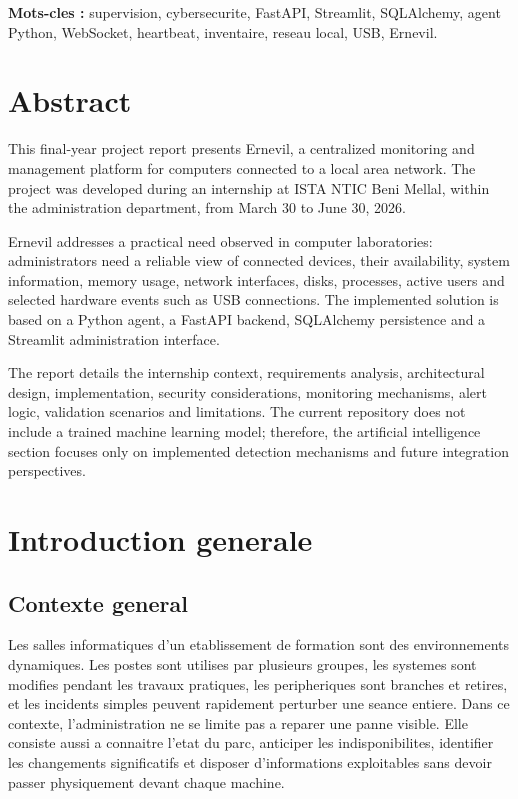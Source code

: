 \documentclass[12pt,a4paper]{report}
\begin{document}
\textbf{Mots-cles :} supervision, cybersecurite, FastAPI, Streamlit, SQLAlchemy, agent Python, WebSocket, heartbeat, inventaire, reseau local, USB, Ernevil.

\chapter*{Abstract}
This final-year project report presents Ernevil, a centralized monitoring and management platform for computers connected to a local area network. The project was developed during an internship at ISTA NTIC Beni Mellal, within the administration department, from March 30 to June 30, 2026.

Ernevil addresses a practical need observed in computer laboratories: administrators need a reliable view of connected devices, their availability, system information, memory usage, network interfaces, disks, processes, active users and selected hardware events such as USB connections. The implemented solution is based on a Python agent, a FastAPI backend, SQLAlchemy persistence and a Streamlit administration interface.

The report details the internship context, requirements analysis, architectural design, implementation, security considerations, monitoring mechanisms, alert logic, validation scenarios and limitations. The current repository does not include a trained machine learning model; therefore, the artificial intelligence section focuses only on implemented detection mechanisms and future integration perspectives.

\tableofcontents
\listoffigures
\listoftables

\chapter{Introduction generale}

\section{Contexte general}
Les salles informatiques d'un etablissement de formation sont des environnements dynamiques. Les postes sont utilises par plusieurs groupes, les systemes sont modifies pendant les travaux pratiques, les peripheriques sont branches et retires, et les incidents simples peuvent rapidement perturber une seance entiere. Dans ce contexte, l'administration ne se limite pas a reparer une panne visible. Elle consiste aussi a connaitre l'etat du parc, anticiper les indisponibilites, identifier les changements significatifs et disposer d'informations exploitables sans devoir passer physiquement devant chaque machine.
\end{document}
